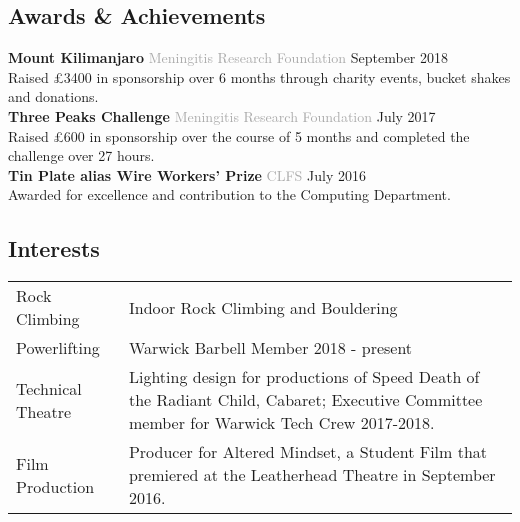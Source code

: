 \documentclass[11pt]{article}
\newcommand{\linesep}{\noindent\makebox[\linewidth]{\rule{\linewidth}{0.2pt}}}
\begin{document}
  \linesep

  \subsection*{Awards \& Achievements}
\textbf{Mount Kilimanjaro} \hfill \hspace{4em} \textcolor{darkgray}{Meningitis Research Foundation} \hfill September 2018 \\
\hspace*{2em} Raised £3400 in sponsorship over 6 months through charity events, bucket shakes and  donations.
\vspace{1ex}\\
\textbf{Three Peaks Challenge} \hfill \textcolor{darkgray}{Meningitis Research Foundation} \hfill July 2017 \\
\hspace*{2em} Raised £600 in sponsorship over the course of 5 months and completed the challenge over 27 hours.
\vspace{1ex}\\
\textbf{Tin Plate alias Wire Workers’ Prize} \hfill \hspace{-17em} \textcolor{darkgray}{CLFS} \hfill July 2016 \\
\hspace*{2em} Awarded for excellence and contribution to the Computing Department.

  \linesep

  \subsection*{Interests}
   \begin{center}
    \begin{tabularx}{\linewidth}{ X X }
Rock Climbing & Indoor Rock Climbing and Bouldering \\
Powerlifting & Warwick Barbell Member 2018 - present \\
Technical Theatre & Lighting design for productions of Speed Death of the Radiant
Child, Cabaret; Executive Committee member for Warwick Tech Crew 2017-2018.\\
Film Production & Producer for Altered Mindset, a Student Film that premiered at 
the Leatherhead Theatre in September 2016.
    \end{tabularx}
   \end{center}

  \linesep

\titlespacing*{\subsection}{5pt}{2pt}{3pt}
\end{document}
